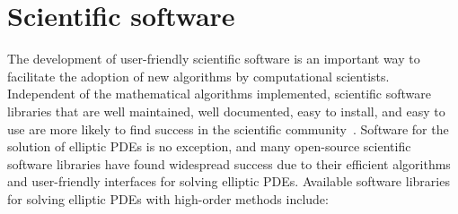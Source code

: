 %

\section{Scientific software}


The development of user-friendly scientific software is an important way to facilitate the adoption of new algorithms by computational scientists. Independent of the mathematical algorithms implemented, scientific software libraries that are well maintained, well documented, easy to install, and easy to use are more likely to find success in the scientific community~\cite{LeVeque_13_01}. Software for the solution of elliptic PDEs is no exception, and many open-source scientific software libraries have found widespread success due to their efficient algorithms and user-friendly interfaces for solving elliptic PDEs. Available software libraries for solving elliptic PDEs with high-order methods include:

